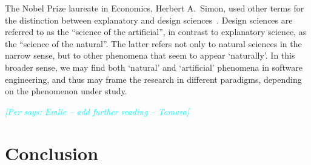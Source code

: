 \documentclass[graybox]{svmult}
\newcommand{\per}[1]{\textcolor{cyan}{{\it [Per says: #1]}}}
\newcommand{\per}[1]{}
\begin{document}
The Nobel Prize laureate in Economics, Herbert A.\ Simon, used other terms for the distinction between explanatory and design sciences~\cite{Simons69}. Design sciences are referred to as the ``science of the artificial'', in contrast to explanatory science, as the ``science of the natural''. The latter refers not only to natural sciences in the narrow sense, but to other phenomena that seem to appear `naturally'. In this broader sense, we may find both `natural' and `artificial' phenomena in software engineering, and thus may frame the research in different paradigms, depending on the phenomenon under study. 

\per{Emlie -- add further reading -- Tamara}






\section{Conclusion}
\label{sec:conclusion}




\end{document}
